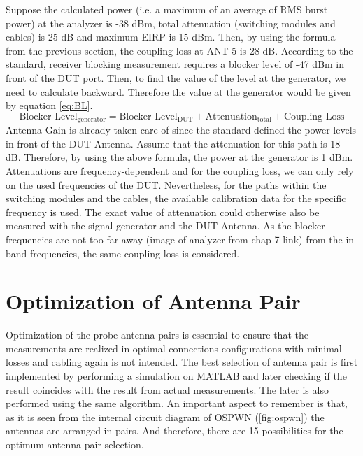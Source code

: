 Suppose the calculated power (i.e. a maximum of an average of \acs{RMS} burst power) at the analyzer is -38 dBm, total attenuation (switching modules and cables) is 25 dB and maximum \acs{EIRP} is 15 dBm. Then, by using the formula from the previous section, the coupling loss at ANT 5 is 28 dB. According to the standard, receiver blocking measurement requires a blocker level of -47 dBm in front of the \acs{DUT} port. Then, to find the value of the level at the generator, we need to calculate backward. Therefore the value at the generator would be given by equation \ref{eq:BL}.
\begin{equation}
\mbox{Blocker Level}_{\mbox{generator}}  = \mbox{Blocker Level}_{\mbox{DUT}} + \mbox{Attenuation}_{\mbox{total}} + \mbox{Coupling Loss} \label{eq:BL}
\end{equation}
Antenna Gain is already taken care of since the standard defined the power levels in front of the \acs{DUT} Antenna. Assume that the attenuation for this path is 18 dB. Therefore, by using the above formula, the power at the generator is 1 dBm. Attenuations are frequency-dependent and for the coupling loss, we can only rely on the used frequencies of the \acs{DUT}. Nevertheless, for the paths within the switching modules and the cables, the available calibration data for the specific frequency is used. The exact value of attenuation could otherwise also be measured with the signal generator and the \acs{DUT} Antenna. As the blocker frequencies are not too far away (image of analyzer from chap 7 link) from the in-band frequencies, the same coupling loss is considered.

\section{Optimization of Antenna Pair}
Optimization of the probe antenna pairs is essential to ensure that the measurements are realized in optimal connections configurations with minimal losses and cabling again is not intended. The best selection of antenna pair is first implemented by performing a simulation on MATLAB\textregistered{} and later checking if the result coincides with the result from actual measurements. The later is also performed using the same algorithm. An important aspect to remember is that, as it is seen from the internal circuit diagram of OSPWN (\ref{fig:ospwn}) the antennas are arranged in pairs. And therefore, there are 15 possibilities for the optimum antenna pair selection.

